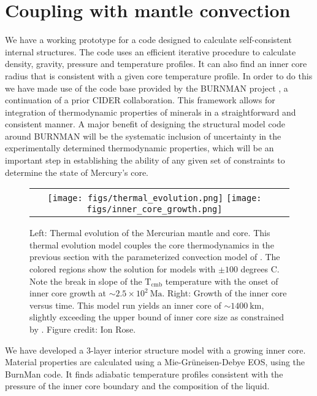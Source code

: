 \section{Coupling with mantle convection}

We have a working prototype for a code designed to calculate self-consistent
internal structures. The code uses an efficient iterative procedure to
calculate density, gravity, pressure and temperature profiles. It can also find
an inner core radius that is consistent with a given core temperature profile. In order to do this we have made use of the
code base provided by the BURNMAN project \citep{Cottaar2014}, a continuation
of a prior CIDER collaboration. This framework allows for integration of
thermodynamic properties of minerals in a straightforward and consistent
manner. A major benefit of designing the structural model code around BURNMAN
will be the systematic inclusion of uncertainty in the experimentally
determined thermodynamic properties, which will be an important step in
establishing the ability of any given set of constraints to determine the state
of Mercury's core. 

 \begin{figure}[h] %
   \centering
\begin{tabular}{cc}
 \texttt{[image: figs/thermal\_evolution.png]}
 \texttt{[image: figs/inner\_core\_growth.png]}
\end{tabular}
\caption{Left: Thermal evolution of the Mercurian mantle and core. This
  thermal evolution model couples the core thermodynamics in the previous section
  with the parameterized convection model of \citep{Stevenson1983}. The colored
  regions show the solution for models with $\pm \mathrm{100}$ degrees C. Note the
  break in slope of the $\mathrm{T_{cmb}}$ temperature with the onset of inner core
  growth at $\sim 2.5\times10^2~\mathrm{Ma}$. Right: Growth of the inner core versus
  time. This model run yields an inner core of $ \sim 1400~\mathrm{km}$, slightly
  exceeding the upper bound of inner core size as constrained by \citep{Dumberry2015}.
  Figure credit: Ion Rose.}
  \label{fig:thermal}
\end{figure}

We have developed a 3-layer interior structure model with a growing inner core.
Material properties are calculated using a Mie-Gr\"{u}neisen-Debye EOS, using the BurnMan
code. It finds adiabatic temperature profiles consistent with the pressure of the 
inner core boundary and the composition of the liquid. 

